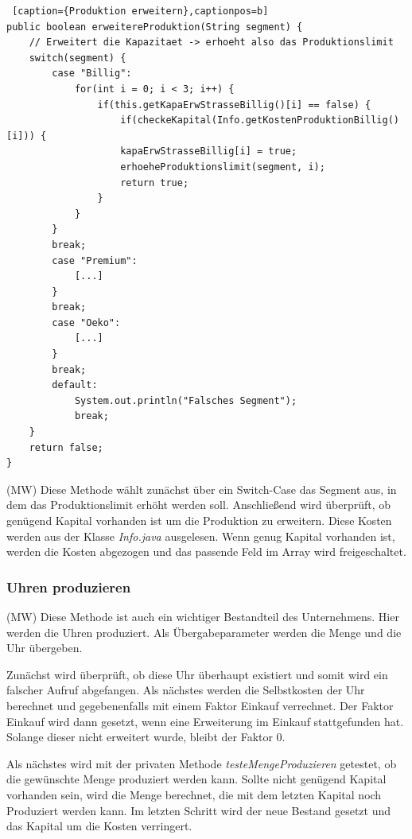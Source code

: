 \lstset{language=Java} 
\begin{lstlisting} [caption={Produktion erweitern},captionpos=b]
public boolean erweitereProduktion(String segment) {
	// Erweitert die Kapazitaet -> erhoeht also das Produktionslimit
	switch(segment) {
		case "Billig":
			for(int i = 0; i < 3; i++) {
				if(this.getKapaErwStrasseBillig()[i] == false) {
					if(checkeKapital(Info.getKostenProduktionBillig()[i])) {
					kapaErwStrasseBillig[i] = true;
					erhoeheProduktionslimit(segment, i);
					return true;
				}
			}
		}
		break;
		case "Premium":
			[...]
		}
		break;
		case "Oeko":
			[...]
		}
		break;
		default:
			System.out.println("Falsches Segment");
			break;
	}
	return false;
}	
\end{lstlisting}

(MW) Diese Methode wählt zunächst über ein Switch-Case das Segment aus, in dem das Produktionslimit erhöht werden soll. Anschließend wird überprüft, ob genügend Kapital vorhanden ist um die Produktion zu erweitern. Diese Kosten werden aus der Klasse \textit{Info.java} ausgelesen. Wenn genug Kapital vorhanden ist, werden die Kosten abgezogen und das passende Feld im Array wird freigeschaltet.

\subsubsection{Uhren produzieren}
(MW) Diese Methode ist auch ein wichtiger Bestandteil des Unternehmens. Hier werden die Uhren produziert. Als Übergabeparameter werden die Menge und die Uhr übergeben. 

Zunächst wird überprüft, ob diese Uhr überhaupt existiert und somit wird ein falscher Aufruf abgefangen. Als nächstes werden die Selbstkosten der Uhr berechnet und gegebenenfalls mit einem Faktor Einkauf verrechnet. Der Faktor Einkauf wird dann gesetzt, wenn eine Erweiterung im Einkauf stattgefunden hat. Solange dieser nicht erweitert wurde, bleibt der Faktor 0.

Als nächstes wird mit der privaten Methode \textit{testeMengeProduzieren} getestet, ob die gewünschte Menge produziert werden kann. Sollte nicht genügend Kapital vorhanden sein, wird die Menge berechnet, die mit dem letzten Kapital noch Produziert werden kann. Im letzten Schritt wird der neue Bestand gesetzt und das Kapital um die Kosten verringert.

